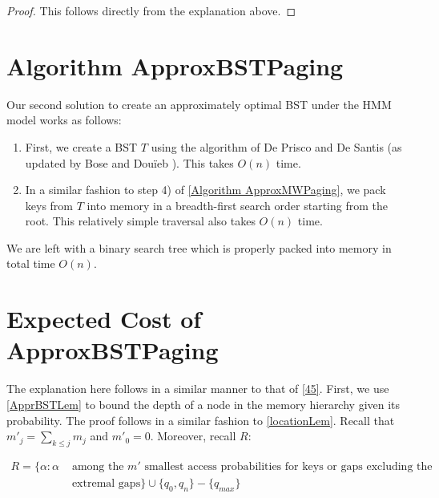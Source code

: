 \documentclass[letterpaper,12pt,titlepage,oneside,final]{book}
\theoremstyle{plain}
\begin{document}
\begin{proof}
This follows directly from the explanation above.
\end{proof}

\section{Algorithm ApproxBSTPaging}\label{Algorithm ApproxBSTPaging}

Our second solution to create an approximately optimal BST under the HMM model works as follows: \\

\begin{enumerate}
\item First, we create a BST $T$ using the algorithm of De Prisco and De Santis \cite{de1993binary} (as updated by Bose and Dou\"{i}eb \cite{bose2009efficient}). This takes $O(n)$ time. \\

\item In a similar fashion to step 4) of \ref{Algorithm ApproxMWPaging}, we pack keys from $T$ into memory in a breadth-first search order starting from the root. This relatively simple traversal also takes $O(n)$ time.
\end{enumerate}

We are left with a binary search tree which is properly packed into memory in total time $O(n)$.


\section{Expected Cost of ApproxBSTPaging}\label{48}

The explanation here follows in a similar manner to that of \ref{45}. First, we use \ref{ApprBSTLem} to bound the depth of a node in the memory hierarchy given its probability. The proof follows in a similar fashion to \ref{locationLem}. Recall that $m'_j = \sum_{k \leq j} m_j$ and $m'_0 = 0$. Moreover, recall $R$:

\begin{align*}
R = \{\alpha : \alpha &\text{ among the }m' \text{ smallest access probabilities for keys or gaps excluding the} \\
&\text{ extremal gaps} \} \cup \{q_0, q_n\} - \{q_{max}\}
\end{align*}
\end{document}
